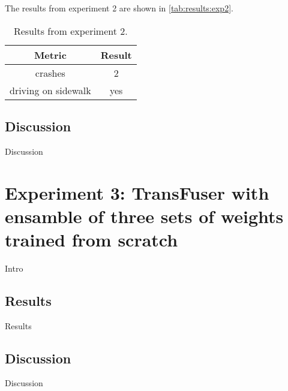 The results from experiment 2 are shown in \autoref{tab:results:exp2}.

\begin{table}[]
    \centering
    \begin{tabular}{c|c}
        \textbf{Metric} & \textbf{Result} \\ \hline
        crashes & 2 \\ \hline
        driving on sidewalk & yes
    \end{tabular}
    \caption{Results from experiment 2.}
    \label{tab:results:exp2}
\end{table}


\subsection{Discussion}

Discussion


\section{Experiment 3: TransFuser with ensamble of three sets of weights trained from scratch}
\label{sec:experiment3}

Intro

\subsection{Results}

Results


\subsection{Discussion}

Discussion
